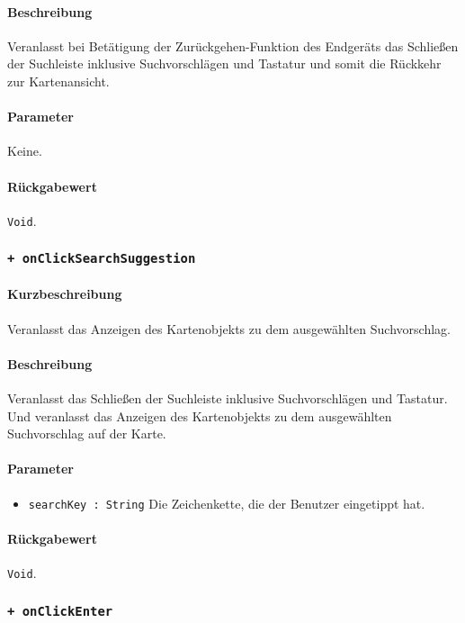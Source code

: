 \paragraph*{Beschreibung}
Veranlasst bei Betätigung der Zurückgehen-Funktion des Endgeräts das Schließen der Suchleiste inklusive Suchvorschlägen und Tastatur und somit die Rückkehr zur Kartenansicht.
\paragraph*{Parameter}
Keine.
\paragraph*{Rückgabewert}
\texttt{Void}.

\subsubsection*{\texttt{+ onClickSearchSuggestion}}\label{App_Search_SearchScreen_onClickSearchSuggestion}%
\paragraph*{Kurzbeschreibung}
Veranlasst das Anzeigen des Kartenobjekts zu dem ausgewählten Suchvorschlag.
\paragraph*{Beschreibung}
Veranlasst das Schließen der Suchleiste inklusive Suchvorschlägen und Tastatur.
Und veranlasst das Anzeigen des Kartenobjekts zu dem ausgewählten Suchvorschlag auf der Karte.
\paragraph*{Parameter}
\begin{itemize}
    \item \texttt{searchKey : String} Die Zeichenkette, die der Benutzer eingetippt hat.
\end{itemize}
\paragraph*{Rückgabewert}
\texttt{Void}.

\subsubsection*{\texttt{+ onClickEnter}}\label{App_Search_SearchScreen_onClickEnter}%
